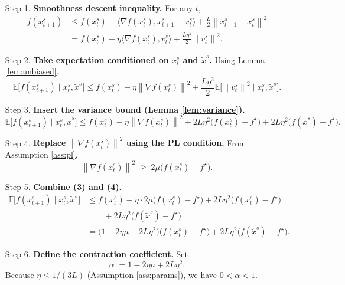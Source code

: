\documentclass{article}
\newcommand{\E}{\mathbb{E}}
\newcommand{\norm}[1]{\left\lVert#1\right\rVert}
\begin{document}
\begin{enumerate}
\item[Step 1.] \textbf{Smoothness descent inequality.}  
For any $t$,
\[
\begin{aligned}
f(x_{t+1}^{s})
&\le f(x_{t}^{s})+\langle\nabla f(x_{t}^{s}),x_{t+1}^{s}-x_{t}^{s}\rangle
   +\frac{L}{2}\norm{x_{t+1}^{s}-x_{t}^{s}}^{2}\\
&= f(x_{t}^{s})-\eta\langle\nabla f(x_{t}^{s}),v_{t}^{s}\rangle
   +\frac{L\eta^{2}}{2}\norm{v_{t}^{s}}^{2}.
\end{aligned}
\tag{1}
\]

\item[Step 2.] \textbf{Take expectation conditioned on $x_{t}^{s}$ and $\tilde{x}^{s}$.}  
Using Lemma \ref{lem:unbiased},
\[
\E\!\bigl[f(x_{t+1}^{s})\mid x_{t}^{s},\tilde{x}^{s}\bigr]
\le f(x_{t}^{s})-\eta\norm{\nabla f(x_{t}^{s})}^{2}
   +\frac{L\eta^{2}}{2}\E\!\bigl[\norm{v_{t}^{s}}^{2}\mid x_{t}^{s},\tilde{x}^{s}\bigr].
\tag{2}
\]

\item[Step 3.] \textbf{Insert the variance bound (Lemma \ref{lem:variance}).}
\[
\E\!\bigl[f(x_{t+1}^{s})\mid x_{t}^{s},\tilde{x}^{s}\bigr]
\le f(x_{t}^{s})-\eta\norm{\nabla f(x_{t}^{s})}^{2}
   +2L\eta^{2}\bigl(f(x_{t}^{s})-f^{\star}\bigr)
   +2L\eta^{2}\bigl(f(\tilde{x}^{s})-f^{\star}\bigr).
\tag{3}
\]

\item[Step 4.] \textbf{Replace $\norm{\nabla f(x_{t}^{s})}^{2}$ using the PL condition.}  
From Assumption \ref{ass:pl},
\[
\norm{\nabla f(x_{t}^{s})}^{2}\;\ge\;2\mu\bigl(f(x_{t}^{s})-f^{\star}\bigr).
\tag{4}
\]

\item[Step 5.] \textbf{Combine (3) and (4).}
\[
\begin{aligned}
\E\!\bigl[f(x_{t+1}^{s})\mid x_{t}^{s},\tilde{x}^{s}\bigr]
&\le f(x_{t}^{s})-
\eta\cdot2\mu\bigl(f(x_{t}^{s})-f^{\star}\bigr)
   +2L\eta^{2}\bigl(f(x_{t}^{s})-f^{\star}\bigr)\\
&\qquad+2L\eta^{2}\bigl(f(\tilde{x}^{s})-f^{\star}\bigr)\\
&= \bigl(1-2\eta\mu+2L\eta^{2}\bigr)\bigl(f(x_{t}^{s})-f^{\star}\bigr)
   +2L\eta^{2}\bigl(f(\tilde{x}^{s})-f^{\star}\bigr).
\end{aligned}
\tag{5}
\]

\item[Step 6.] \textbf{Define the contraction coefficient.}  
Set
\[
\alpha:=1-2\eta\mu+2L\eta^{2}.
\]
Because $\eta\le 1/(3L)$ (Assumption \ref{ass:params}), we have $0<\alpha<1$.


\end{enumerate}
\end{document}
